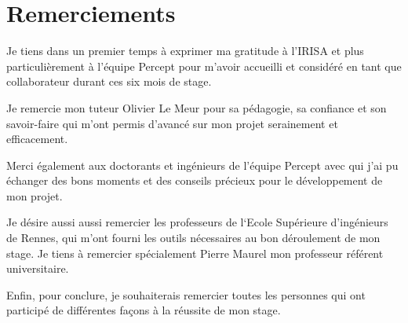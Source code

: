 \chapter{Remerciements}
\par
    Je tiens dans un premier temps à exprimer ma gratitude à l'IRISA et plus particulièrement à l'équipe Percept pour m'avoir accueilli et considéré en tant que collaborateur durant ces six mois de stage.
\vspace{24pt}
\par
    Je remercie mon tuteur Olivier Le Meur pour sa pédagogie, sa confiance et son savoir-faire qui m'ont permis d'avancé sur mon projet serainement et efficacement.
\vspace{24pt}
\par
    Merci également aux doctorants et ingénieurs de l'équipe Percept avec qui j'ai pu échanger des bons moments et des conseils précieux pour le développement de mon projet.
\vspace{24pt}
\par
    Je désire aussi aussi remercier les professeurs de l‘Ecole Supérieure d'ingénieurs de Rennes, qui m’ont fourni les outils nécessaires au bon déroulement de mon stage. Je tiens à remercier spécialement Pierre Maurel mon professeur référent universitaire.

\vspace{24pt}
\par
    Enfin, pour conclure, je souhaiterais remercier toutes les personnes qui ont participé de différentes façons à la réussite de mon stage.